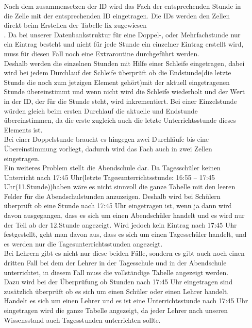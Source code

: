 Nach dem zusammensetzen der ID wird das Fach der entsprechenden Stunde in die Zelle mit der entsprechenden ID eingetragen. Die IDs werden den Zellen direkt beim Erstellen der Tabelle fix zugewiesen\\.
Da bei unserer Datenbankstruktur für eine Doppel-, oder Mehrfachstunde nur ein Eintrag besteht und nicht für jede Stunde ein einzelner Eintrag erstellt wird, muss für diesen Fall noch eine Extraroutine durchgeführt werden.\\
Deshalb werden die einzelnen Stunden mit Hilfe einer Schleife eingetragen, dabei wird bei jedem Durchlauf der Schleife überprüft ob die Endstunde(die letzte Stunde die noch zum jetzigen Element gehört)mit der aktuell eingetragenen Stunde übereinstimmt und wenn nicht wird die Schleife wiederholt und der Wert in der ID, der für die Stunde steht, wird inkrementiert. Bei einer Einzelstunde würden gleich beim ersten Durchlauf die aktuelle und Endstunde übereinstimmen, da die erste zugleich auch die letzte Unterrichtsstunde dieses Elements ist.\\
Bei einer Doppelstunde braucht es hingegen zwei Durchläufe bis eine Übereinstimmung vorliegt, dadurch wird das Fach auch in zwei Zellen eingetragen.\\
Ein weiteres Problem stellt die Abendschule dar. Da Tagesschüler keinen Unterricht nach 17:45 Uhr(letzte Tagesunterrichtsstunde: 16:55 – 17:45 Uhr(11.Stunde))haben wäre es nicht sinnvoll die ganze Tabelle mit den leeren Felder für die Abendschulstunden anzuzeigen. Deshalb wird bei Schülern überprüft ob eine Stunde nach 17:45 Uhr eingetragen ist, wenn ja dann wird davon ausgegangen, dass es sich um einen Abendschüler handelt und es wird nur der Teil ab der 12.Stunde angezeigt. Wird jedoch kein Eintrag nach 17:45 Uhr festgestellt, geht man davon aus, dass es sich um einen Tagesschüler handelt, und es werden nur die Tagesunterrichtsstunden angezeigt.\\
Bei Lehrern gibt es nicht nur diese beiden Fälle, sondern es gibt auch noch einen dritten Fall bei dem der Lehrer in der Tagesschule und in der Abendschule unterrichtet, in diesem Fall muss die vollständige Tabelle angezeigt werden.\\
Dazu wird bei der Überprüfung ob Stunden nach 17:45 Uhr eingetragen sind zusätzlich überprüft ob es sich um einen Schüler oder einen Lehrer handelt. Handelt es sich um einen Lehrer und es ist eine Unterrichtsstunde nach 17:45 Uhr eingetragen wird die ganze Tabelle angezeigt, da jeder Lehrer nach unseren Wissensstand auch Tagesstunden unterrichten sollte.\\

